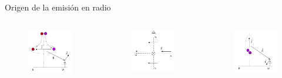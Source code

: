 \documentclass{beamer}
\begin{document}
\begin{frame}{Origen de la emisión en radio}
	\begin{columns}

	\begin{figure}[H]
		\centering
		\includegraphics[width=.6\linewidth]{figures/Geomag_deflexion_1}
	\end{figure}
	\begin{figure}[H]
	\centering
	\includegraphics[width=.6\linewidth]{figures/Geomag_deflexion_2}
\end{figure}
\begin{figure}[H]
	\centering
	\includegraphics[width=.6\linewidth]{figures/Askaryan_1}

\end{figure}
\end{columns}
\end{frame}
\end{document}
